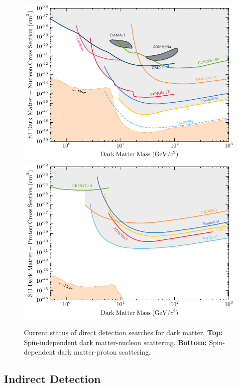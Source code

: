\begin{figure}
    \centering
    \includegraphics{img/chapter_1/DM_limits_SI.pdf}
    \includegraphics{img/chapter_1/DM_limits_SD_p.pdf}
    \caption{Current status of direct detection searches for dark matter. \textbf{Top:} Spin-independent dark matter-nucleon scattering. \textbf{Bottom:} Spin-dependent dark matter-proton scattering.}
    \label{fig:direct_detection_lims}
\end{figure}
\subsection{Indirect Detection}


